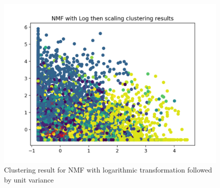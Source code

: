 \documentclass{report}
\begin{document}
\\

\begin{figure}
  \includegraphics[width=\linewidth]{p5_nmf_clustering.png} 
  \vspace*{-20mm}
  \caption{Clustering result for NMF with logarithmic transformation followed by unit variance}
  \label{fig:nmf6}
\end{figure}
\end{document}
